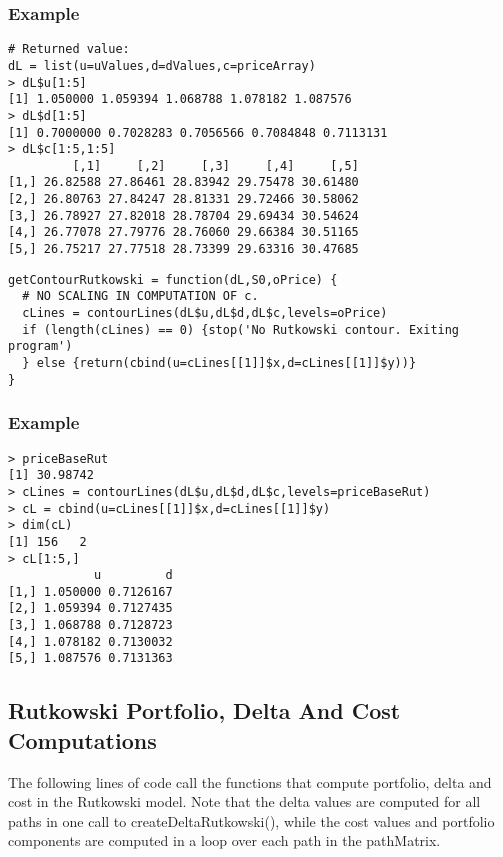 \documentclass[10pt]{article}
\begin{document}
\subsubsection*{Example}

\begin{verbatim}
# Returned value:
dL = list(u=uValues,d=dValues,c=priceArray)
> dL$u[1:5]
[1] 1.050000 1.059394 1.068788 1.078182 1.087576
> dL$d[1:5]
[1] 0.7000000 0.7028283 0.7056566 0.7084848 0.7113131
> dL$c[1:5,1:5]
         [,1]     [,2]     [,3]     [,4]     [,5]
[1,] 26.82588 27.86461 28.83942 29.75478 30.61480
[2,] 26.80763 27.84247 28.81331 29.72466 30.58062
[3,] 26.78927 27.82018 28.78704 29.69434 30.54624
[4,] 26.77078 27.79776 28.76060 29.66384 30.51165
[5,] 26.75217 27.77518 28.73399 29.63316 30.47685
\end{verbatim}

\begin{verbatim}
getContourRutkowski = function(dL,S0,oPrice) {
  # NO SCALING IN COMPUTATION OF c.
  cLines = contourLines(dL$u,dL$d,dL$c,levels=oPrice)
  if (length(cLines) == 0) {stop('No Rutkowski contour. Exiting program')
  } else {return(cbind(u=cLines[[1]]$x,d=cLines[[1]]$y))}
}
\end{verbatim}

\subsubsection*{Example}

\begin{verbatim}
> priceBaseRut
[1] 30.98742
> cLines = contourLines(dL$u,dL$d,dL$c,levels=priceBaseRut)
> cL = cbind(u=cLines[[1]]$x,d=cLines[[1]]$y)
> dim(cL)
[1] 156   2
> cL[1:5,]
            u         d
[1,] 1.050000 0.7126167
[2,] 1.059394 0.7127435
[3,] 1.068788 0.7128723
[4,] 1.078182 0.7130032
[5,] 1.087576 0.7131363
\end{verbatim}

\subsection*{Rutkowski Portfolio, Delta And Cost Computations}

The following lines of code call the functions that compute portfolio, delta and cost in the Rutkowski model.
Note that the delta values are computed for all paths in one call to createDeltaRutkowski(), while the
cost values and portfolio components are computed in a loop over each path in the pathMatrix.
\end{document}
